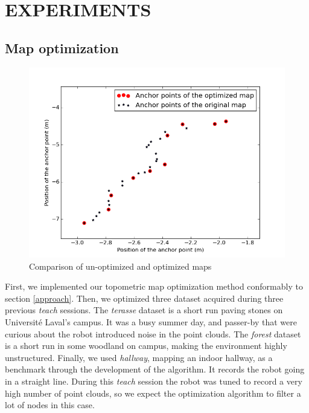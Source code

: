 \documentclass[letterpaper,10 pt,conference]{ieeeconf}
\begin{document}
\section{EXPERIMENTS}

\subsection{Map optimization}

\begin{figure}
  \centering
  \includegraphics[scale=0.4]{map_optimization}
  \caption{Comparison of un-optimized and optimized maps}
\end{figure}

First, we implemented our topometric map optimization method conformably to section \ref{approach}.
Then, we optimized three dataset acquired during three previous \textit{teach} sessions. The
\textit{terasse} dataset is a short run paving stones on Université Laval's campus. It was a busy
summer day, and passer-by that were curious about the robot introduced noise in the point
clouds. The \textit{forest} dataset is a short run in some woodland on campus, making the environment
highly unstructured. Finally, we used \textit{hallway}, mapping an indoor hallway, as a
benchmark through the development of the algorithm. It records the robot going in a straight line.
During this \textit{teach} session the robot was tuned to record a very high number of point clouds,
so we expect the optimization algorithm to filter a lot of nodes in this case.
\end{document}

